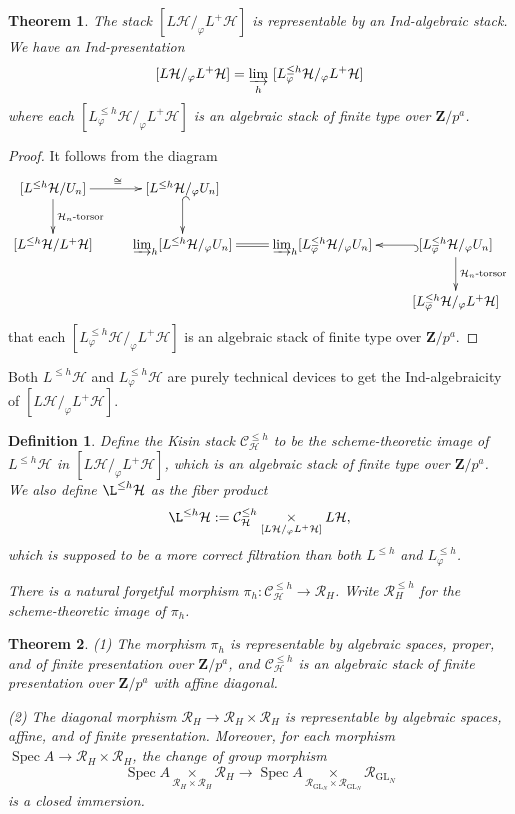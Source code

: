 \documentclass[11pt]{amsart}
\newtheorem{thm}{Theorem}
\newtheorem{dfn}{Definition}
\numberwithin{thm}{section}
\numberwithin{lem}{section}
\numberwithin{cor}{section}
\numberwithin{prop}{section}
\numberwithin{exam}{section}
\numberwithin{dfn}{section}
\newcommand{\GL}{\operatorname{GL}}
\newcommand{\spec}{\operatorname{Spec}}
\newcommand{\dirlim}[1]{{\varinjlim_{#1}}}
\newcommand{\cC}{\mathcal{C}}
\newcommand{\clR}{\mathcal{R}}
\newcommand{\clH}{\mathcal{H}}
\newcommand{\Z}{\mathbf{Z}}
\begin{document}
\begin{thm}
\label{thm:PR-0}
The stack $[L\clH/_\varphi L^+\clH]$
is representable by an Ind-algebraic stack.
We have an Ind-presentation
$$
[L\clH/_\varphi L^+\clH]= \dirlim{h}~[L^{\le h}_\varphi\clH/_\varphi L^+\clH]
$$
where each $[L^{\le h}_\varphi\clH/_\varphi L^+\clH]$
is an algebraic stack of finite type over $\Z/p^a$.
\end{thm}

\begin{proof}
It follows from the diagram
$$
\xymatrix{
    [L^{\le h}\clH/U_{n}] \ar[r]^{\cong}
    \ar[d]^{\text{$\clH_{n}$-torsor}} &
    [L^{\le h}\clH/_\varphi U_{n}] \ar@{^{(}->}[d] \\
    [L^{\le h}\clH/L^+\clH] 
    & \dirlim{h}[L^{\le h}\clH/_\varphi U_{n}]
    \ar@{=}[r]& \dirlim{h}[L^{\le h}_\varphi\clH/_\varphi U_{n}]
    &
    [L^{\le h}_\varphi\clH/_\varphi U_{n}]
     \ar@{^{(}->}[l]\ar[d]^{\text{$\clH_n$-torsor}}\\
 &       && [L^{\le h}_\varphi \clH/_\varphi L^+\clH]
}
$$
that each $[L^{\le h}_\varphi \clH/_\varphi L^+\clH]$
is an algebraic stack of finite type over $\Z/p^a$.
\end{proof}

Both $L^{\le h}\clH$
and $L^{\le h}_\varphi\clH$
are purely technical devices
to get the Ind-algebraicity of
$[L\clH/_\varphi L^+\clH]$.

\begin{dfn}
Define the Kisin stack $\cC_{\clH}^{\le h}$
to be the scheme-theoretic image of
$L^{\le h}\clH$
in 
$[L\clH/_\varphi L^+\clH]$,
which is an algebraic stack of finite type over $\Z/p^a$.
We also define
$\L^{\le h}\clH$
as the fiber product
\[
\L^{\le h}\clH
:=
\cC_{\clH}^{\le h}
\underset{[L\clH/_\varphi L^+\clH]}{\times}
L\clH,
\]
which is supposed to be a more correct
filtration than both
$L^{\le h}$
and $L^{\le h}_\varphi$.

There is a natural forgetful morphism
$\pi_h:\cC_{\clH}^{\le h}\to \clR_H$.
Write $\clR_{H}^{\le h}$
for the scheme-theoretic image of $\pi_h$.
\end{dfn}

\begin{thm}
\label{thm:pappas-rapoport}
(1) 
The morphism $\pi_h$
is representable by algebraic spaces, proper, and of finite presentation
over $\Z/p^a$,
and
$\cC^{\le h}_{\clH}$
is an algebraic stack of finite presentation
over $\Z/p^a$ with affine diagonal.

(2)
The diagonal morphism
$\clR_{H} \to \clR_{H}\times\clR_{H}$
is representable by algebraic spaces,
affine, and of finite presentation.
Moreover,
for each morphism $\spec A\to \clR_{H}\times\clR_{H}$,
the change of group morphism
$$
\spec A\underset{\clR_{H}\times\clR_{H}}{\times}\clR_{H}
\to
\spec A\underset{\clR_{\GL_N}\times\clR_{\GL_N}}{\times}\clR_{\GL_N}
$$
is a closed immersion.
\end{thm}
\end{document}
